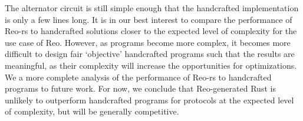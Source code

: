 The alternator circuit is still simple enough that the handcrafted implementation is only a few lines long. It is in our best interest to compare the performance of Reo-rs to handcrafted solutions closer to the expected level of complexity for the use case of Reo. However, as programs become more complex, it becomes more difficult to design fair `objective' handcrafted programs such that the results are meaningful, as their complexity will increase the opportunities for optimizations. We a more complete analysis of the performance of Reo-rs to handcrafted programs to future work. For now, we conclude that Reo-generated Rust is unlikely to outperform handcrafted programs for protocols at the expected level of complexity, but will be generally competitive.

\begin{figure}
	\centering
\end{figure}
